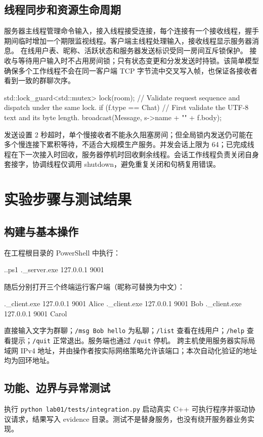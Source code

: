 \documentclass[UTF8,notitlepage,11pt]{ctexart}
\newcommand{\src}[1]{\nolinkurl{#1}}
\begin{document}
\subsection{线程同步和资源生命周期}
服务器主线程管理命令输入，接入线程接受连接，每个连接有一个接收线程，握手期间临时增加一个期限监视线程。客户端主线程处理输入，接收线程显示服务器消息。
在线用户表、昵称、活跃状态和服务器发送标识受同一房间互斥锁保护。
接收与等待用户输入时不占用房间锁；只有状态变更和分发发送时持锁。该简单模型确保多个工作线程不会在同一客户端 TCP 字节流中交叉写入帧，也保证各接收者看到一致的群聊次序。

\begin{code}
std::lock_guard<std::mutex> lock(room);
// Validate request sequence and dispatch under the same lock.
if (f.type == Chat) {
    // First validate the UTF-8 text and its byte length.
    broadcast(Message, s->name + "\n" + f.body);
}
\end{code}

发送设置 2 秒超时，单个慢接收者不能永久阻塞房间；但全局锁内发送仍可能在多个慢连接下累积等待，不适合大规模生产服务。并发会话上限为 64；已完成线程在下一次接入时回收，服务器停机时回收剩余线程。会话工作线程负责关闭自身套接字，协调线程仅调用 shutdown，避免重复关闭和句柄复用错误。

\section{实验步骤与测试结果}
\subsection{构建与基本操作}
在工程根目录的 PowerShell 中执行：
\begin{code}
.\build.ps1
.\bin\chat_server.exe 127.0.0.1 9001
\end{code}
随后分别打开三个终端运行客户端（昵称可替换为中文）：
\begin{code}
.\bin\chat_client.exe 127.0.0.1 9001 Alice
.\bin\chat_client.exe 127.0.0.1 9001 Bob
.\bin\chat_client.exe 127.0.0.1 9001 Carol
\end{code}
直接输入文字为群聊；\src{/msg Bob hello} 为私聊；\src{/list} 查看在线用户；\src{/help} 查看提示；\src{/quit} 正常退出。服务端也通过 \src{/quit} 停机。
跨主机使用服务器实际局域网 IPv4 地址，并由操作者按实际网络策略允许该端口；本次自动化验证的地址均为回环地址。

\subsection{功能、边界与异常测试}
执行 \src{python lab01/tests/integration.py} 启动真实 C++ 可执行程序并驱动协议请求，结果写入 evidence 目录。测试不是替身服务，也没有绕开服务器业务实现。
\end{document}
